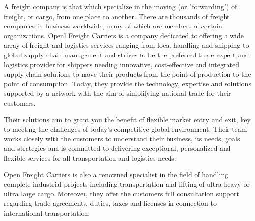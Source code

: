 A freight company is that which specialize in the moving (or "forwarding")
of freight, or cargo, from one place to another. There are thousands 
of freight companies in business worldwide, many of which are members 
of certain organizations. Openl Freight Carriers is a company dedicated 
to offering a wide array of freight and logistics services ranging from 
local handling and shipping to global supply chain management and 
strives to be the preferred trade expert and logistics provider for 
shippers needing innovative, cost-effective and integrated supply chain 
solutions to move their products from the point of production to the 
point of consumption. Today, they provide the technology, expertise 
and solutions supported by a network with the aim of simplifying 
national trade for their customers.

Their solutions aim to grant you the benefit of flexible market entry 
and exit, key to meeting the challenges of today's competitive global 
environment. Their team works closely with the customers to understand 
their business, its needs, goals and strategies and is committed to 
delivering exceptional, personalized and flexible services for all 
transportation and logistics needs.

Open Freight Carriers is also a renowned specialist in the field of 
handling complete industrial projects including transportation and 
lifting of ultra heavy or ultra large cargo. Moreover, they offer the 
customers full consultation support regarding trade agreements, duties, 
taxes and licenses in connection to international transportation.


